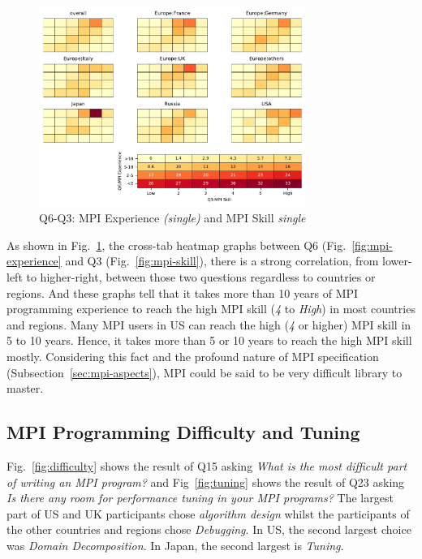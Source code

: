 \documentclass[preprint,5p,times]{elsarticle}
\def\myquote#1{{\it #1}}
\begin{document}
\begin{figure}[htb]
\begin{center}
\includegraphics[width=8.7cm]{Figs/Q6-Q3.pdf}
\caption{Q6-Q3: MPI Experience {\it(single)} and MPI Skill {\it single}}
\label{fig:experience-and-skill}
\end{center}
\end{figure}

As shown in Fig.~\ref{fig:experience-and-skill}, the cross-tab heatmap
graphs between Q6 (Fig.~\ref{fig:mpi-experience} and Q3
(Fig.~\ref{fig:mpi-skill}), there is a strong correlation, from
lower-left to higher-right, between those
two questions regardless to countries or regions. And these graphs
tell that it takes more than 10 years of MPI programming experience to
reach the high MPI skill (\myquote{4} to \myquote{High}) in most
countries and regions. Many MPI users in US can reach the high
(\myquote{4} or higher) MPI skill in 5 to 10 years. Hence, it takes
more than 5 or 10 years to reach the high MPI skill
mostly. Considering this fact
and the profound nature of MPI specification
(Subsection~\ref{sec:mpi-aspects}), MPI could be said to be very
difficult library to master.

\subsection{MPI Programming Difficulty and Tuning}

Fig.~\ref{fig:difficulty} shows the result of Q15 asking \myquote{What is the
most difficult part of writing an MPI program?} and
Fig~\ref{fig:tuning} shows the result of Q23 asking \myquote{Is there any
room for performance tuning in your MPI programs?} The largest part
of US and UK participants chose \myquote{algorithm design} whilst the
participants of the other countries and regions chose
\myquote{Debugging}. In US, the second largest choice was
\myquote{Domain Decomposition}. In Japan, the second largest is
\myquote{Tuning}.
\end{document}
